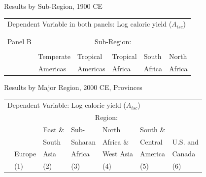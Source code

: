 \documentclass[10pt, xcolor=dvipsnames]{beamer}
\begin{document}
\begin{frame}{Results by Sub-Region, 1900 CE}

{\scriptsize
\begin{tabularx}{\textwidth}{lXXXXX}
\midrule
\multicolumn{6}{l}{Dependent Variable in both panels: Log caloric yield ($A_{isc}$)} \\ \\
\\
Panel B & \multicolumn{5}{c}{Sub-Region:} \\ \cmidrule{2-6}
 &           &   &           &          &             \\
 & Temperate & Tropical  & Tropical & South    & North    \\
 & Americas  & Americas  & Africa   & Africa   & Africa     \\
\midrule

\midrule
\end{tabularx}
}

\hfill \hyperlink{robustness}{}
\end{frame}

\begin{frame}{Results by Major Region, 2000 CE, Provinces}\label{regprov}

{\scriptsize
\begin{tabularx}{\textwidth}{lXXXXXX}
\midrule
\multicolumn{7}{l}{Dependent Variable: Log caloric yield ($A_{isc}$)} \\
 & \multicolumn{6}{c}{Region:} \\ \cmidrule{2-7}
 &        & East \& & Sub-        & North     & South \&  &  \\
 &        & South   & Saharan     & Africa \& & Central   & U.S. and \\
 & Europe & Asia    & Africa      & West Asia & America   & Canada \\
 & (1) & (2) & (3) & (4) & (5) & (6) \\
\midrule

\midrule
\end{tabularx}
}

\hfill \hyperlink{robustness}{}
\end{frame}
\end{document}
